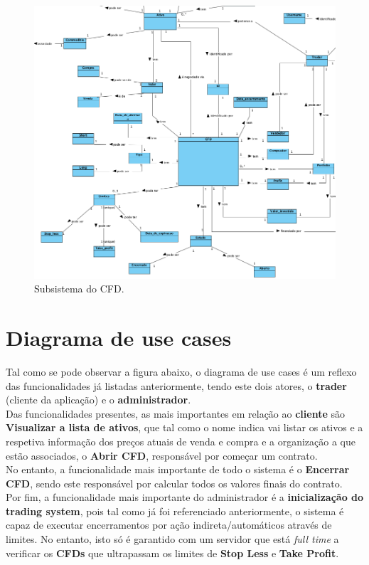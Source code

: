 \documentclass[11pt,a4paper]{report}%
\begin{document}
\begin{figure}[H]
	\includegraphics[scale=0.5]{modelo-dominio-3.png}
	\caption{Subsistema do CFD. }
	\label{img:pag}
\end{figure}

\newpage

\section{Diagrama de use cases}

Tal como se pode observar a figura abaixo, o diagrama de use cases é um reflexo das funcionalidades já listadas anteriormente, tendo este dois atores, o \textbf{trader} (cliente da aplicação) e o \textbf{administrador}. \\
Das funcionalidades presentes, as mais importantes em relação ao \textbf{cliente} são \textbf{Visualizar a lista de ativos}, que tal como o nome indica vai listar os ativos e a respetiva informação dos preços atuais de venda e compra e a organização a que estão associados, o \textbf{Abrir CFD}, responsável por começar um contrato. \\ No entanto, a funcionalidade mais importante de todo o sistema é o \textbf{Encerrar CFD}, sendo este responsável por calcular todos os valores finais do contrato. \\ Por fim, a funcionalidade mais importante do administrador é a \textbf{inicialização do trading system}, pois tal como já foi referenciado anteriormente, o sistema é capaz de executar encerramentos por ação indireta/automáticos através de limites. No entanto, isto só é garantido com um servidor que está \emph{full time} a verificar os \textbf{CFDs} que ultrapassam os limites de \textbf{Stop Less} e \textbf{Take Profit}. 
\end{document}
